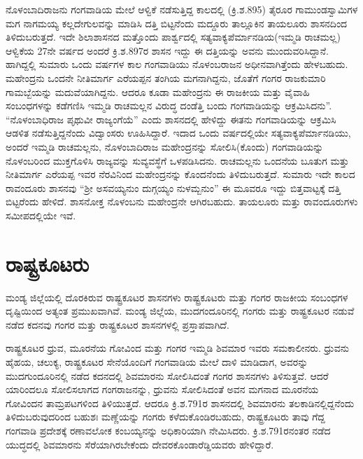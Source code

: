 ನೊಳಂಬಾದಿರಾಜನು ಗಂಗವಾಡಿಯ ಮೇಲೆ ಆಳ್ವಿಕೆ ನಡೆಸುತ್ತಿದ್ದ ಕಾಲದಲ್ಲಿ (ಕ್ರಿ.ಶ.895) ತೈರೂರ ಗಾಮುಂಡಸ್ವಾಮಿಗಳ ಮಗ ನಾಗಮಯ್ಯ ಕಲ್ಲದೇಗುಲವನ್ನು ಮಾಡಿಸಿ ದತ್ತಿ ಬಿಟ್ಟನೆಂದು ಮದ್ದೂರು ತಾಲ್ಲೂಕಿನ ತಾಯಲೂರು ಶಾಸನದಿಂದ ತಿಳಿದುಬರುತ್ತದೆ. ಇದೇ ಶಿಲಾಶಾಸನದ ಮತ್ತೊಂದು ಪಾರ್ಶ್ವದಲ್ಲಿ ಸತ್ಯವಾಕ್ಯಪೆರ್ಮಾನಡಿಯ(ಇಮ್ಮಡಿ ರಾಚಮಲ್ಲ) ಆಳ್ವಿಕೆಯ 27ನೇ ವರ್ಷದ ಅಂದರೆ ಕ್ರಿ.ಶ.897ರ ಶಾಸನ ಇದ್ದು ಈ ದತ್ತಿಯನ್ನು ಅವನು ಮುಂದುವರಿಸಿದ್ದಾನೆ. ಹಾಗಿದ್ದಲ್ಲಿ ಸುಮಾರು ಒಂದು ವರ್ಷಗಳ ಕಾಲ ಗಂಗವಾಡಿಯು ನೊಳಂಬರಾಜನ ಅಧೀನವಾಗಿತ್ತೆಂದು ಹೇಳಬಹುದು. ಮಹೇಂದ್ರನು ಒಂದನೇ ನೀತಿಮಾರ್ಗ ಎರೆಯಪ್ಪನ ತಂಗಿಯ ಮಗನಾಗಿದ್ದನು, ಜೊತೆಗೆ ಗಂಗರ ರಾಜಕುಮಾರಿ ಗಾಮಬ್ಬೆಯನ್ನು ಮದುವೆ\-ಯಾಗಿದ್ದನು. ಆದರೂ ಕೂಡಾ ಮಹೇಂದ್ರನು ಈ ರಾಜಕೀಯ ಮತ್ತು ವೈವಾಹಿ ಸಂಬಂಧಗಳನ್ನು ಕಡೆಗಣಿಸಿ ಇಮ್ಮಡಿ ರಾಚಮಲ್ಲನ ವಿರುದ್ಧ ದಂಡೆತ್ತಿ ಬಂದು ಗಂಗವಾಡಿಯನ್ನು ಆಕ್ರಮಿಸಿದನು”. “ನೊಳಂಬಾಧಿರಾಜ ಪೃಥುವೀ ರಾಜ್ಯಂಗೆಯೆ” ಎಂದು ಶಾಸನದಲ್ಲಿ ಹೇಳಿದ್ದು ಈತನು ಗಂಗವಾಡಿಯನ್ನು ಆಕ್ರಮಿಸಿ ಆಡಳಿತ ನಡೆಸುತ್ತಿದ್ದನೆಂದು ವಿದ್ವಾಂಸರು ಊಹಿಸಿದ್ದಾರೆ. ಇದಾದ ಒಂದು ವರ್ಷದಲ್ಲಿಯೇ ಸತ್ಯವಾಕ್ಯಪೆರ್ಮಾನಡಿಯು, ಅಂದರೆ ಇಮ್ಮಡಿ ರಾಚಮಲ್ಲನು, ನೊಳಂಬಾದಿರಾಜ ಮಹೇಂದ್ರನನ್ನು ಸೋಲಿಸಿ(ಕೊಂದು) ಗಂಗವಾಡಿಯನ್ನು ನೊಳಂಬರಿಂದ ಮುಕ್ತಗೊಳಿಸಿ ರಾಜ್ಯವನ್ನು ಸುವ್ಯವಸ್ಥೆಗೆ ಒಳಪಡಿ\-ಸಿದನು. ರಾಚಮಲ್ಲನು ಒಂದನೆಯ ಬೂತುಗ ಮತ್ತು ನೀತಿಮಾರ್ಗ ಎರೆಯಪ್ಪ ಇವರ ನೆರವಿನಿಂದ ಮಹೇಂದ್ರನನ್ನು ಕೊಂದನೆಂದು ತಿಳಿದುಬರುತ್ತದೆ. ಸುಮಾರು ಇದೇ ಕಾಲದ ರಾವಂದೂರು ಶಾಸನವು “ಶ‍್ರೀ ಅಸವಯ್ಯನುಂ ದುಗ್ಗಯ್ಯಂ ನುಳಮ್ಬನುಂ” ಈ ಮೂವರೂ ಇದ್ದು ಬಿತ್ತವಾಟ್ಟಕ್ಕೆ ದತ್ತಿ ಬಿಟ್ಟರೆಂದು ಹೇಳಿದೆ. ಶಾಸನೋಕ್ತ ನೊಳಂಬನು ಮಹೇಂದ್ರನೇ ಆಗಿರಬಹುದು. ತಾಯಲೂರು ಮತ್ತು ರಾವಂದೂರುಗಳು ಸಮೀಪದಲ್ಲಿಯೇ ಇವೆ.


\section{ರಾಷ್ಟ್ರಕೂಟರು}

ಮಂಡ್ಯ ಜಿಲ್ಲೆಯಲ್ಲಿ ದೊರಕಿರುವ ರಾಷ್ಟ್ರಕೂಟರ ಶಾಸನಗಳು ರಾಷ್ಟ್ರಕೂಟರು ಮತ್ತು ಗಂಗರ ರಾಜಕೀಯ ಸಂಬಂಧಗಳ ದೃಷ್ಟಿಯಿಂದ ಅತ್ಯಂತ ಪ್ರಮುಖವಾಗಿವೆ. ಮಂಡ್ಯ ಜಿಲ್ಲೆಯ, ಮುದಗಂದೂರಿನಲ್ಲಿ ಗಂಗರು ಮತ್ತು ರಾಷ್ಟ್ರಕೂಟರ ನಡುವೆ ನಡೆದ ಕದನವು ಗಂಗರ ಮತ್ತು ರಾಷ್ಟ್ರಕೂಟರ ಶಾಸನಗಳಲ್ಲಿ ಪ್ರಸ್ತಾಪವಾಗಿದೆ. 

ರಾಷ್ಟ್ರಕೂಟರ ಧ್ರುವ, ಮೂರನೆಯ ಗೋವಿಂದ ಮತ್ತು ಗಂಗರ ಇಮ್ಮಡಿ ಶಿವಮಾರ ಇವರು ಸಮಕಾಲೀನರು. ಧ್ರುವನು ಹೈಹಯ, ಚಲುಕ್ಯ, ರಾಷ್ಟ್ರಕೂಟರ ಸೇನೆಯೊಂದಿಗೆ ಗಂಗವಾಡಿಯ ಮೇಲೆ ದಾಳಿ ಮಾಡಿದಾಗ, ಅವರನ್ನು ಮುದಗುಂದೂರಿನಲ್ಲಿ ನಡೆದ ಕದನದಲ್ಲಿ ಶಿವಮಾರನು ಸೋಲಿಸಿದಂತೆ ಗಂಗರ ಶಾಸನಗಳು ತಿಳಿಸುತ್ತವೆ. ಆದರೆ ಯಾರಿಂದಲೂ ಸೋಲಿಸಲಾಗದ ಗಂಗರಾಜನನ್ನು, ಧ್ರುವನು ಸೋಲಿಸಿದಂತೆ ಅವನ ಮಗನಾದ ಮೂರನೆಯ ಗೋವಿಂದನ ತಾಮ್ರಪಟಗಳಿಂದ ತಿಳಿಯುತ್ತದೆ. ಆದರೂ ಕ್ರಿ.ಶ.791ರ ಶಾಸನದಲ್ಲಿ ಶಿವಮಾರನು ತಲಕಾಡಿನಲ್ಲಿದ್ದನೆಂದು ತಿಳಿದುಬರುವುದರಿಂದ ಬಹುಶಃ ಮಣ್ಣೆಯನ್ನು ಗಂಗರು ಕಳೆದುಕೊಂಡಿರಬಹುದು, ರಾಷ್ಟ್ರಕೂಟರು ತಾವು ಗೆದ್ದ ಗಂಗವಾಡಿ ಪ್ರದೇಶಕ್ಕೆ ರಣಾವಲೋಕ ಕಂಬಯ್ಯನನ್ನು ಅಧಿಕಾರಿಯಾಗಿ ನೇಮಿಸಿದರು. ಕ್ರಿ.ಶ.791ರನಂತರ ನಡೆದ ಯುದ್ಧದಲ್ಲಿ ಶಿವಮಾರನು ಸೆರೆಯಾಗಿರಬೇಕೆಂದು ದೇವರಕೊಂಡಾರೆಡ್ಡಿಯವರು ಹೇಳಿದ್ದಾರೆ.

